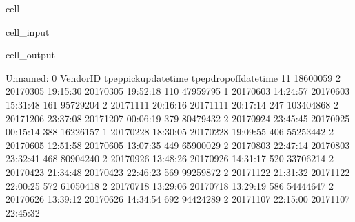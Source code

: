\documentclass[letterpaper,10pt,english]{sphinxmanual}
\begin{document}
\begin{sphinxuseclass}{cell}
\begin{sphinxuseclass}{cell_input}
\begin{sphinxVerbatim}[commandchars=\\\{\}]
  
\PYG{p}{[}\PYG{p}{[}\PYG{p}{]}  \PYG{p}{]}
\end{sphinxVerbatim}

\end{sphinxuseclass}
\begin{sphinxuseclass}{cell_output}
\begin{sphinxVerbatim}[commandchars=\\\{\}]
      Unnamed: 0  VendorID tpep\PYGZus{}pickup\PYGZus{}datetime tpep\PYGZus{}dropoff\PYGZus{}datetime  \PYGZbs{}
11      18600059         2  2017\PYGZhy{}03\PYGZhy{}05 19:15:30   2017\PYGZhy{}03\PYGZhy{}05 19:52:18   
110     47959795         1  2017\PYGZhy{}06\PYGZhy{}03 14:24:57   2017\PYGZhy{}06\PYGZhy{}03 15:31:48   
161     95729204         2  2017\PYGZhy{}11\PYGZhy{}11 20:16:16   2017\PYGZhy{}11\PYGZhy{}11 20:17:14   
247    103404868         2  2017\PYGZhy{}12\PYGZhy{}06 23:37:08   2017\PYGZhy{}12\PYGZhy{}07 00:06:19   
379     80479432         2  2017\PYGZhy{}09\PYGZhy{}24 23:45:45   2017\PYGZhy{}09\PYGZhy{}25 00:15:14   
388     16226157         1  2017\PYGZhy{}02\PYGZhy{}28 18:30:05   2017\PYGZhy{}02\PYGZhy{}28 19:09:55   
406     55253442         2  2017\PYGZhy{}06\PYGZhy{}05 12:51:58   2017\PYGZhy{}06\PYGZhy{}05 13:07:35   
449     65900029         2  2017\PYGZhy{}08\PYGZhy{}03 22:47:14   2017\PYGZhy{}08\PYGZhy{}03 23:32:41   
468     80904240         2  2017\PYGZhy{}09\PYGZhy{}26 13:48:26   2017\PYGZhy{}09\PYGZhy{}26 14:31:17   
520     33706214         2  2017\PYGZhy{}04\PYGZhy{}23 21:34:48   2017\PYGZhy{}04\PYGZhy{}23 22:46:23   
569     99259872         2  2017\PYGZhy{}11\PYGZhy{}22 21:31:32   2017\PYGZhy{}11\PYGZhy{}22 22:00:25   
572     61050418         2  2017\PYGZhy{}07\PYGZhy{}18 13:29:06   2017\PYGZhy{}07\PYGZhy{}18 13:29:19   
586     54444647         2  2017\PYGZhy{}06\PYGZhy{}26 13:39:12   2017\PYGZhy{}06\PYGZhy{}26 14:34:54   
692     94424289         2  2017\PYGZhy{}11\PYGZhy{}07 22:15:00   2017\PYGZhy{}11\PYGZhy{}07 22:45:32   

\end{sphinxVerbatim}
\end{sphinxuseclass}
\end{sphinxuseclass}
\end{document}
